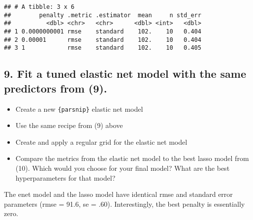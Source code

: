 \documentclass[
]{article}
\newenvironment{Shaded}{\begin{snugshade}}{\end{snugshade}}
\newcommand{\DataTypeTok}[1]{\textcolor[rgb]{0.13,0.29,0.53}{#1}}
\newcommand{\DecValTok}[1]{\textcolor[rgb]{0.00,0.00,0.81}{#1}}
\newcommand{\KeywordTok}[1]{\textcolor[rgb]{0.13,0.29,0.53}{\textbf{#1}}}
\newcommand{\NormalTok}[1]{#1}
\newcommand{\OperatorTok}[1]{\textcolor[rgb]{0.81,0.36,0.00}{\textbf{#1}}}
\newcommand{\StringTok}[1]{\textcolor[rgb]{0.31,0.60,0.02}{#1}}
\providecommand{\tightlist}{%
  \setlength{\itemsep}{0pt}\setlength{\parskip}{0pt}}
\begin{document}
\begin{Shaded}
\end{Shaded}

\begin{verbatim}
## # A tibble: 3 x 6
##        penalty .metric .estimator  mean     n std_err
##          <dbl> <chr>   <chr>      <dbl> <int>   <dbl>
## 1 0.0000000001 rmse    standard    102.    10   0.404
## 2 0.00001      rmse    standard    102.    10   0.404
## 3 1            rmse    standard    102.    10   0.405
\end{verbatim}

\hypertarget{fit-a-tuned-elastic-net-model-with-the-same-predictors-from-9.}{%
\subsection{9. Fit a tuned elastic net model with the same predictors
from
(9).}\label{fit-a-tuned-elastic-net-model-with-the-same-predictors-from-9.}}

\begin{itemize}
\tightlist
\item
  Create a new \texttt{\{parsnip\}} elastic net model
\item
  Use the same recipe from (9) above
\item
  Create and apply a regular grid for the elastic net model
\item
  Compare the metrics from the elastic net model to the best lasso model
  from (10). Which would you choose for your final model? What are the
  best hyperparameters for that model?
\end{itemize}

The enet model and the lasso model have identical rmse and standard
error parameters (rmse = 91.6, se = .60). Interestingly, the best
penalty is essentially zero.
\end{document}
